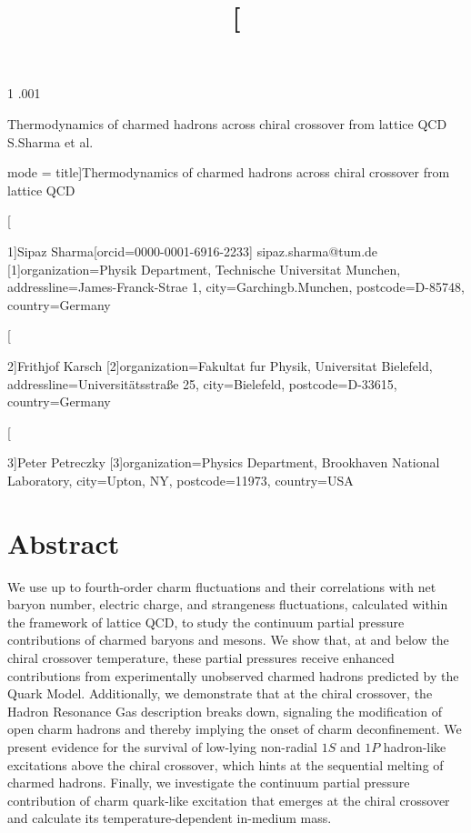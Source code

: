 \documentclass[11pt,a4paper]{article}
\title{[}
\begin{document}
\maketitle

1
.001

Thermodynamics of charmed hadrons across chiral crossover from lattice QCD    
S.Sharma et al.

mode = title]Thermodynamics of charmed hadrons across chiral crossover from lattice QCD

[

1]Sipaz Sharma[orcid=0000-0001-6916-2233]
sipaz.sharma@tum.de
[1]organization=Physik Department, Technische Universitat Munchen,
 addressline=James-Franck-Strae 1, 
 city=Garchingb.Munchen,
 postcode=D-85748, 
 country=Germany

[

2]Frithjof Karsch
        [2]organization=Fakultat fur Physik, Universitat Bielefeld,
 	addressline=Universitätsstraße 25, 
 	city=Bielefeld,
 	postcode=D-33615, 
 	country=Germany

[

3]Peter Petreczky
        [3]organization=Physics Department, Brookhaven National Laboratory,
 	city=Upton, NY,
 	postcode=11973, 
 	country=USA

\section{Abstract}

We use up to fourth-order charm fluctuations and their correlations with net baryon number, electric charge, and strangeness fluctuations, calculated within the framework of lattice QCD, to study the continuum partial pressure contributions of charmed baryons and mesons. We show that, at and below the chiral crossover temperature, these partial pressures receive enhanced contributions from experimentally unobserved charmed hadrons predicted by the Quark Model. Additionally, we demonstrate that at the chiral crossover, the Hadron Resonance Gas description breaks down, signaling the modification of open charm hadrons and thereby implying the onset of charm deconfinement. We present evidence for the survival of low-lying non-radial $1S$ and $1P$ hadron-like excitations above the chiral crossover, which hints at the sequential melting of charmed hadrons. Finally, we investigate the continuum partial pressure contribution of charm quark-like excitation that emerges at the chiral crossover and calculate its temperature-dependent in-medium mass.
\end{document}
